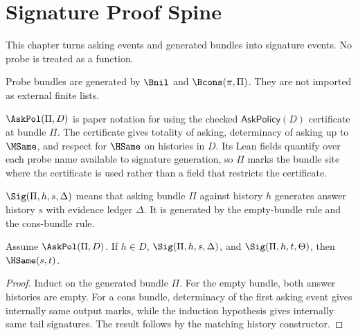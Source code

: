 
\chapter{Signature Proof Spine}
\label{ch:proof-standing-signature-proof-spine}

This chapter turns asking events and generated bundles into signature events. No probe is treated as a function.

\begin{definition}
Probe bundles are generated by \(\Bnil\) and \(\Bcons(\pi,\Pi)\). They are not imported as external finite lists.
\end{definition}

\begin{definition}
$\AskPol(\Pi,D)$ is paper notation for using the checked $\mathsf{AskPolicy}(D)$ certificate at bundle $\Pi$.
The certificate gives totality of asking, determinacy of asking up to $\MSame$, and respect for $\HSame$ on histories in $D$.
Its Lean fields quantify over each probe name available to signature generation, so $\Pi$ marks the bundle site where the certificate is used rather than a field that restricts the certificate.
\end{definition}

\begin{definition}
\label{def:proof-standing-signature-event}
\(\Sig(\Pi,h,s,\Delta)\) means that asking bundle \(\Pi\) against history \(h\) generates answer history \(s\) with evidence ledger \(\Delta\). It is generated by the empty-bundle rule and the cons-bundle rule.
\end{definition}

\begin{theorem}
\label{thm:signature-determinacy-proof-spine}
\label{thm:signature-determinacy-spine}
Assume \(\AskPol(\Pi,D)\). If \(h\in D\), \(\Sig(\Pi,h,s,\Delta)\), and \(\Sig(\Pi,h,t,\Theta)\), then \(\HSame(s,t)\).
\end{theorem}
\begin{proof}
Induct on the generated bundle \(\Pi\). For the empty bundle, both answer histories are empty. For a cons bundle, determinacy of the first asking event gives internally same output marks, while the induction hypothesis gives internally same tail signatures. The result follows by the matching history constructor.
\end{proof}

